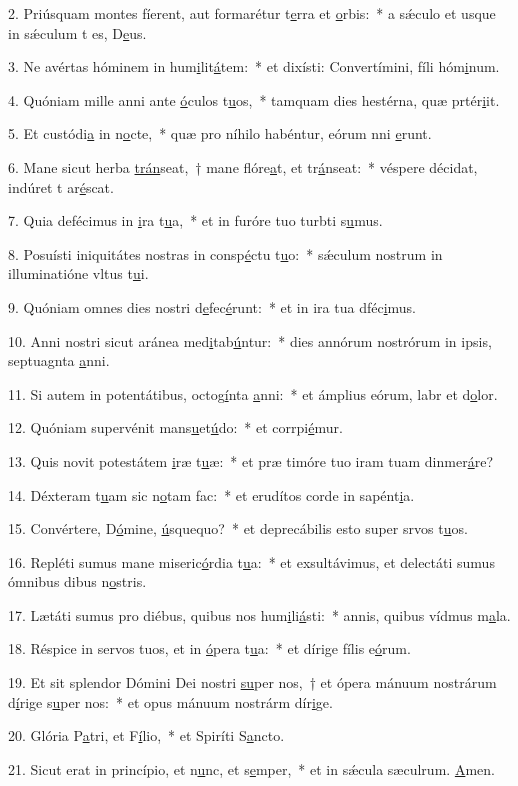 2. Priúsquam montes fíerent, aut formarétur t\uline{e}rra et \uline{o}rbis:~* a sǽculo et usque in sǽculum t es, D\uline{e}us.\par 
3. Ne avértas hóminem in hum\uline{i}lit\uline{á}tem:~* et dixísti: Convertímini, fíli hóm\uline{i}num.\par 
4. Quóniam mille anni ante \uline{ó}culos t\uline{u}os,~* tamquam dies hestérna, quæ prtér\uline{i}it.\par 
5. Et custódi\uline{a} in n\uline{o}cte,~* quæ pro níhilo habéntur, eórum nni \uline{e}runt.\par 
6. Mane sicut herba \uline{trán}seat,~† mane flóre\uline{a}t, et tr\uline{á}nseat:~* véspere décidat, indúret t ar\uline{é}scat.\par 
7. Quia defécimus in \uline{i}ra t\uline{u}a,~* et in furóre tuo turbti s\uline{u}mus.\par 
8. Posuísti iniquitátes nostras in consp\uline{é}ctu t\uline{u}o:~* sǽculum nostrum in illuminatióne vltus t\uline{u}i.\par 
9. Quóniam omnes dies nostri d\uline{e}fec\uline{é}runt:~* et in ira tua dféc\uline{i}mus.\par 
10. Anni nostri sicut aránea med\uline{i}tab\uline{ú}ntur:~* dies annórum nostrórum in ipsis, septuagnta \uline{a}nni.\par 
11. Si autem in potentátibus, octog\uline{í}nta \uline{a}nni:~* et ámplius eórum, labr et d\uline{o}lor.\par 
12. Quóniam supervénit mans\uline{u}et\uline{ú}do:~* et corrpi\uline{é}mur.\par 
13. Quis novit potestátem \uline{i}ræ t\uline{u}æ:~* et præ timóre tuo iram tuam dinmer\uline{á}re?\par 
14. Déxteram t\uline{u}am sic n\uline{o}tam fac:~* et erudítos corde in sapént\uline{i}a.\par 
15. Convértere, D\uline{ó}mine, \uline{ú}squequo?~* et deprecábilis esto super srvos t\uline{u}os.\par 
16. Repléti sumus mane miseric\uline{ó}rdia t\uline{u}a:~* et exsultávimus, et delectáti sumus ómnibus dibus n\uline{o}stris.\par 
17. Lætáti sumus pro diébus, quibus nos hum\uline{i}li\uline{á}sti:~* annis, quibus vídmus m\uline{a}la.\par 
18. Réspice in servos tuos, et in \uline{ó}pera t\uline{u}a:~* et dírige fílis e\uline{ó}rum.\par 
19. Et sit splendor Dómini Dei nostri \uline{su}per nos,~† et ópera mánuum nostrárum d\uline{í}rige s\uline{u}per nos:~* et opus mánuum nostrárm dír\uline{i}ge.\par 
20. Glória P\uline{a}tri, et F\uline{í}lio,~* et Spiríti S\uline{a}ncto.\par 
21. Sicut erat in princípio, et n\uline{u}nc, et s\uline{e}mper,~* et in sǽcula sæculrum. \uline{A}men.\par 
